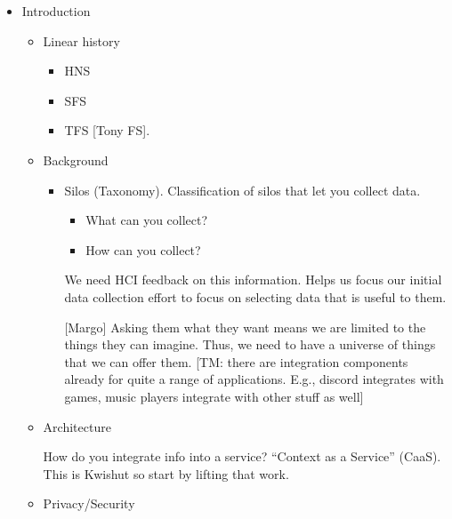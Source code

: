 \begin{itemize}
\item Introduction
\begin{itemize}
    \item Linear history
          \begin{itemize}
              \item HNS
              \item SFS
              \item TFS [Tony FS].
          \end{itemize}

    \item Background
          \begin{itemize}
              \item Silos (Taxonomy).  Classification of silos that let you collect data.
                    \begin{itemize}
                        \item What can you collect?
                        \item How can you collect?
                    \end{itemize}

                    We need HCI feedback on this information.  Helps us focus our initial
                    data collection effort to focus on selecting data that is useful to
                    them.

                        [Margo] Asking them what they want means we are limited to the things
                    they can imagine.  Thus, we need to have a universe of things that we
                    can offer them. [TM: there are integration components already for quite
                            a range of applications. E.g., discord integrates with games, music
                            players integrate with other stuff as well]
          \end{itemize}

    \item Architecture

          How do you integrate info into a service?  ``Context as a Service'' (CaaS).
          This is Kwishut so start by lifting that work.

    \item Privacy/Security


\end{itemize}
\end{itemize}
